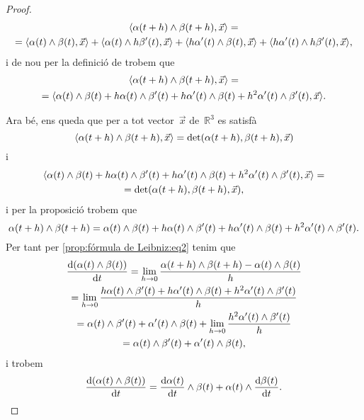 \documentclass[../../main.tex]{subfiles}
\begin{document}
\begin{proof}
\begin{multline*}
            \prodesc{\alpha(t+h)\prodvec\beta(t+h)}{\vec{x}}=\\
            =\prodesc{\alpha(t)\prodvec\beta(t)}{\vec{x}}+\prodesc{\alpha(t)\prodvec h\beta'(t)}{\vec{x}}+\prodesc{h\alpha'(t)\prodvec\beta(t)}{\vec{x}}+\prodesc{h\alpha'(t)\prodvec h\beta'(t)}{\vec{x}},
        \end{multline*}
        i de nou per la definició de  trobem que
        \begin{multline*}
            \prodesc{\alpha(t+h)\prodvec\beta(t+h)}{\vec{x}}=\\
            =\prodesc{\alpha(t)\prodvec\beta(t)+h\alpha(t)\prodvec\beta'(t)+h\alpha'(t)\prodvec\beta(t)+h^{2}\alpha'(t)\prodvec \beta'(t)}{\vec{x}}.
        \end{multline*}

        Ara bé, ens queda que per a tot vector~\(\vec{x}\) de~\(\mathbb{R}^{3}\) es satisfà
        \[
            \prodesc{\alpha(t+h)\prodvec\beta(t+h)}{\vec{x}}=\det(\alpha(t+h),\beta(t+h),\vec{x})
        \]
        i
        \begin{multline*}
            \prodesc{\alpha(t)\prodvec\beta(t)+h\alpha(t)\prodvec\beta'(t)+h\alpha'(t)\prodvec\beta(t)+h^{2}\alpha'(t)\prodvec \beta'(t)}{\vec{x}}=\\=\det(\alpha(t+h),\beta(t+h),\vec{x}),
        \end{multline*}
        i per la proposició  trobem que
        \[
            \alpha(t+h)\mathbin{\wedge}\beta(t+h)=\alpha(t)\mathbin{\wedge}\beta(t)+h\alpha(t)\mathbin{\wedge}\beta'(t)+h\alpha'(t)\mathbin{\wedge}\beta(t)+h^{2}\alpha'(t)\mathbin{\wedge} \beta'(t).
        \]
        Per tant per \eqref{prop:fórmula de Leibniz:eq2} tenim que
        \begin{multline*}
            \frac{\mathop{}\!\mathrm{d}(\alpha(t)\mathbin{\wedge}\beta(t))}{\mathop{}\!\mathrm{d} t}=\lim_{h\to0}\frac{\alpha(t+h)\mathbin{\wedge}\beta(t+h)-\alpha(t)\mathbin{\wedge}\beta(t)}{h}\\
            =\lim_{h\to0}\frac{h\alpha(t)\mathbin{\wedge}\beta'(t)+h\alpha'(t)\mathbin{\wedge}\beta(t)+h^{2}\alpha'(t)\mathbin{\wedge} \beta'(t)}{h}\\
            =\alpha(t)\mathbin{\wedge}\beta'(t)+\alpha'(t)\mathbin{\wedge}\beta(t)+\lim_{h\to0}\frac{h^{2}\alpha'(t)\mathbin{\wedge} \beta'(t)}{h}\\
            =\alpha(t)\mathbin{\wedge}\beta'(t)+\alpha'(t)\mathbin{\wedge}\beta(t),
        \end{multline*}
        i trobem
        \[
            \frac{\mathop{}\!\mathrm{d}(\alpha(t)\mathbin{\wedge}\beta(t))}{\mathop{}\!\mathrm{d} t}=\frac{\mathop{}\!\mathrm{d}\alpha(t)}{\mathop{}\!\mathrm{d} t}\mathbin{\wedge}\beta(t)+\alpha(t)\mathbin{\wedge}\frac{\mathop{}\!\mathrm{d}\beta(t)}{\mathop{}\!\mathrm{d} t}.\qedhere
        \]
    \end{proof}
\end{document}
